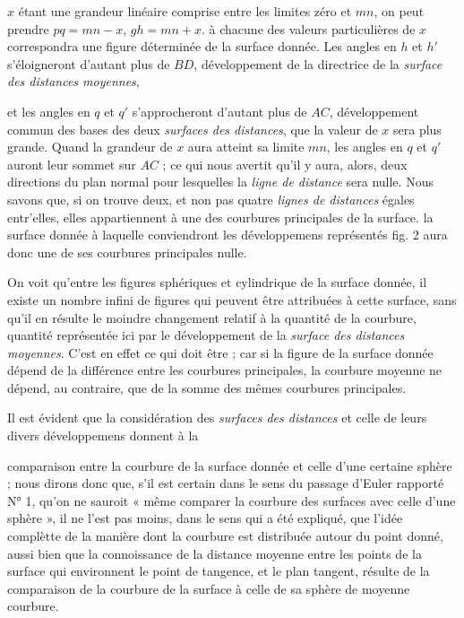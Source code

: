 \documentclass[11pt,a4paper]{article}
\begin{document}
$x$ étant une grandeur linéaire comprise entre les limites zéro et $mn$, on
peut prendre $pq = mn - x$, $gh = mn + x$. à chacune des valeurs
particulières de $x$ correspondra une figure déterminée de la surface
donnée. Les angles en $h$ et $h'$ s'éloigneront d'autant plus de $BD$,
développement de la directrice de la \emph{surface des distances moyennes},

et les angles en $q$ et $q'$ s'approcheront d'autant plus de $AC$,
développement commun des bases des deux \emph{surfaces des distances}, que
la valeur de $x$ sera plus grande. Quand la grandeur de $x$ aura atteint sa
limite $mn$, les angles en $q$ et $q'$ auront leur sommet sur $AC$ ; ce qui
nous avertit qu'il y aura, alors, deux directions du plan normal pour
lesquelles la \emph{ligne de distance} sera nulle. Nous savons que, si on
trouve deux, et non pas quatre \emph{lignes de distances} égales entr'elles,
elles appartiennent à une des courbures principales de la surface. la
surface donnée à laquelle conviendront les développemens représentés fig. 2
aura donc une de ses courbures principales nulle.

On voit  qu'entre les figures sphériques et cylindrique de la
surface donnée, il existe un nombre infini de figures qui peuvent être
attribuées à cette surface, sans qu'il en résulte le moindre changement
relatif à la quantité de la courbure, quantité représentée ici par le
développement de la \emph{surface des distances moyennes}. C'est en effet ce
qui doit être ; car si la figure de la surface donnée dépend de la
différence entre les courbures principales, la courbure moyenne ne dépend,
au contraire, que de la somme des mêmes courbures principales.

Il est évident que la considération des \emph{surfaces des distances} et
celle de leurs divers développemens donnent à la

comparaison entre la courbure de la surface donnée et celle d'une certaine
sphère ; nous dirons donc que, s'il est certain dans le sens du passage
d'Euler rapporté N° 1, qu'on ne sauroit « même comparer la courbure des
surfaces avec celle d'une sphère », il ne l'est pas moins, dans le sens qui
a été expliqué, que l'idée complètte de la manière dont la courbure est
distribuée autour du point donné, aussi bien que la connoissance de la
distance moyenne entre les points de la surface qui environnent le point de
tangence, et le plan tangent, résulte de la comparaison de la courbure de la
surface à celle de sa sphère de moyenne courbure.
\end{document}
